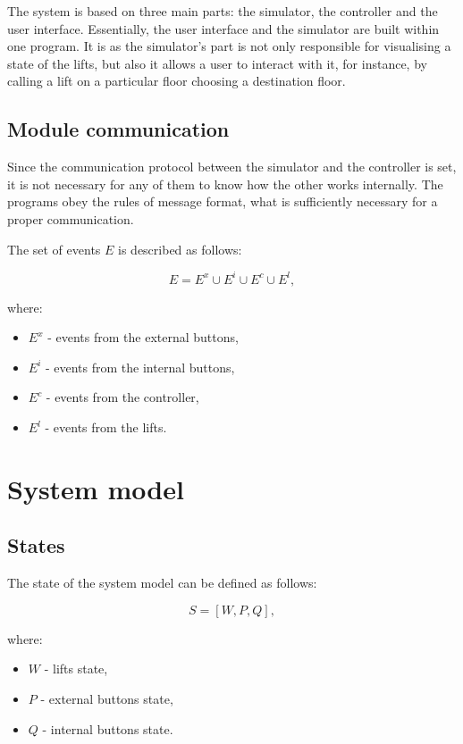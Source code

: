\documentclass[12pt]{article}
\begin{document}
The system is based on three main parts: the simulator, the controller and the user interface. Essentially, the user interface and the simulator are built within one program. It is as the simulator's part is not only responsible for visualising a state of the lifts, but also it allows a user to interact with it, for instance, by calling a lift on a particular floor choosing a destination floor. 

\subsection{Module communication}

Since the communication protocol between the simulator and the controller is set, it is not necessary for any of them to know how the other works internally. The programs obey the rules of message format, what is sufficiently necessary for a proper communication.
\newline
\newline

The set of events $E$ is described as follows:

\[ E = E^x \cup E^i \cup E^c \cup E^l, \]

where:

\begin{itemize}

\item[]$E^x$ - events from the external buttons,

\item[]$E^i$ - events from the internal buttons,

\item[]$E^c$ - events from the controller,

\item[]$E^l$ - events from the lifts.
\end{itemize}



\section{System model}
\subsection{States}
The state of the system model can be defined as follows:

\[ S = [W, P, Q], \]

where:

\begin{itemize}

\item[]$W$ - lifts state,

\item[]$P$ - external buttons state,

\item[]$Q$ - internal buttons state.

\end{itemize}
\end{document}
